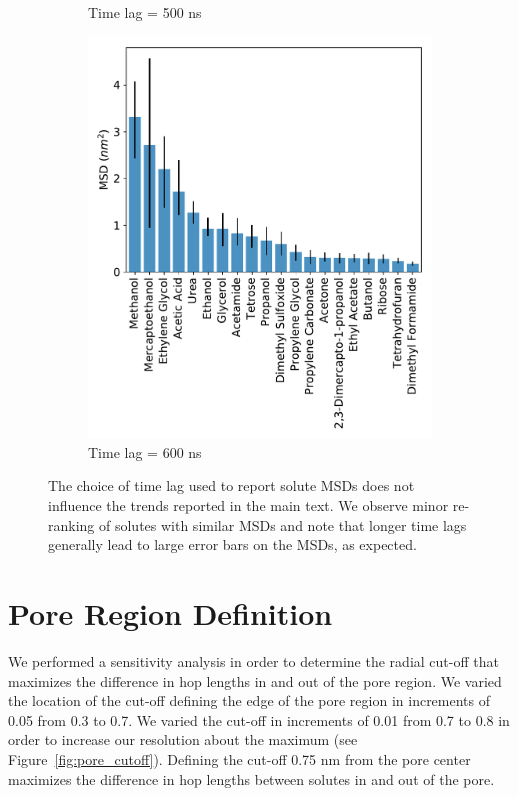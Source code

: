\documentclass{article}
\begin{document}
\begin{figure}[!htb]
\begin{subfigure}{0.325\textwidth}
  \caption{Time lag = 500 ns}\label{fig:F0.5}
  \end{subfigure}
  \begin{subfigure}{0.325\textwidth}
  \includegraphics[width=\textwidth]{all_10wt_tamsds_F0_6.pdf}
  \caption{Time lag = 600 ns}\label{fig:F0.6}
  \end{subfigure}
  \caption{The choice of time lag used to report solute MSDs does not 
  influence the trends reported in the main text. We observe minor re-ranking
  of solutes with similar MSDs and note that longer time lags generally
  lead to large error bars on the MSDs, as expected. }\label{fig:lag_sensitivity}
  \end{figure}
  
  \clearpage
  \section{Pore Region Definition}\label{section:pore-region}
  
  We performed a sensitivity analysis in order to determine the radial 
  cut-off that maximizes the difference in hop lengths in and out of 
  the pore region. We varied the location of the cut-off defining the
  edge of the pore region in increments of 0.05 from 0.3 to 0.7. We
  varied the cut-off in increments of 0.01 from 0.7 to 0.8 in order to
  increase our resolution about the maximum (see Figure~\ref{fig:pore_cutoff}). 
  Defining the cut-off 0.75 nm from the pore center maximizes the 
  difference in hop lengths between solutes in and out of the pore.
  
\end{document}
